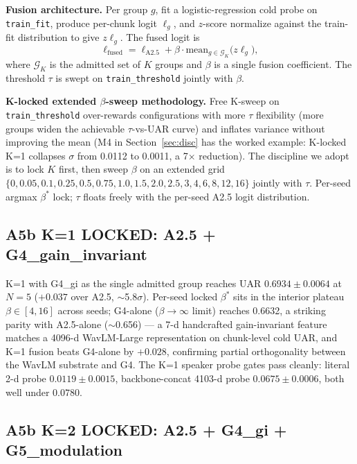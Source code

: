 \textbf{Fusion architecture.} Per group $g$, fit a logistic-regression cold probe on \texttt{train\_fit}, produce per-chunk logit $\ell_g$, and $z$-score normalize against the train-fit distribution to give $z\ell_g$. The fused logit is
\begin{equation}
\ell_{\text{fused}} = \ell_{\text{A2.5}} + \beta \cdot \mathrm{mean}_{g \in \mathcal{G}_K} \big(z\ell_g\big),
\label{eq:fusion}
\end{equation}
where $\mathcal{G}_K$ is the admitted set of $K$ groups and $\beta$ is a single fusion coefficient. The threshold $\tau$ is swept on \texttt{train\_threshold} jointly with $\beta$.

\textbf{K-locked extended $\beta$-sweep methodology.} Free K-sweep on \texttt{train\_threshold} over-rewards configurations with more $\tau$ flexibility (more groups widen the achievable $\tau$-vs-UAR curve) and inflates variance without improving the mean (M4 in Section~\ref{sec:disc} has the worked example: K-locked K=1 collapses $\sigma$ from 0.0112 to 0.0011, a 7$\times$ reduction). The discipline we adopt is to lock $K$ first, then sweep $\beta$ on an extended grid $\{0, 0.05, 0.1, 0.25, 0.5, 0.75, 1.0, 1.5, 2.0, 2.5, 3, 4, 6, 8, 12, 16\}$ jointly with $\tau$. Per-seed argmax $\beta^*$ lock; $\tau$ floats freely with the per-seed A2.5 logit distribution.

\subsection{A5b K=1 LOCKED: A2.5 + G4\_gain\_invariant}

K=1 with G4\_gi as the single admitted group reaches UAR $0.6934 \pm 0.0064$ at $N{=}5$ ($+0.037$ over A2.5, $\sim$5.8$\sigma$). Per-seed locked $\beta^*$ sits in the interior plateau $\beta \in [4, 16]$ across seeds; G4-alone ($\beta \to \infty$ limit) reaches 0.6632, a striking parity with A2.5-alone ($\sim$0.656) — a 7-d handcrafted gain-invariant feature matches a 4096-d WavLM-Large representation on chunk-level cold UAR, and K=1 fusion beats G4-alone by $+0.028$, confirming partial orthogonality between the WavLM substrate and G4. The K=1 speaker probe gates pass cleanly: literal 2-d probe $0.0119 \pm 0.0015$, backbone-concat 4103-d probe $0.0675 \pm 0.0006$, both well under $0.0780$.

\subsection{A5b K=2 LOCKED: A2.5 + G4\_gi + G5\_modulation}
\label{ssec:k2}

